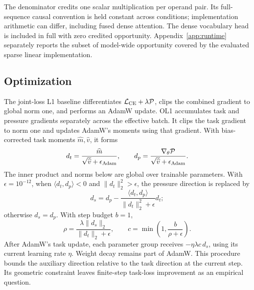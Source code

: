 The denominator credits one scalar multiplication per operand pair.
Its full-sequence causal convention is held constant across conditions;
implementation arithmetic can differ, including fused dense attention.
The dense vocabulary head is included in full with zero credited opportunity.
Appendix~\ref{app:runtime} separately reports the subset of model-wide
opportunity covered by the evaluated sparse linear implementation.

\subsection{Optimization}
\label{app:optimization}
The joint-loss L1 baseline differentiates
$\mathcal{L}_{\rm CE}+\lambda\mathcal{P}$, clips the combined gradient to
global norm one, and performs an AdamW update. OL1 accumulates task and
pressure gradients separately across the effective batch. It clips the task
gradient to norm one and updates AdamW's moments using that gradient.
With bias-corrected task moments $\widehat m,\widehat v$, it forms
\begin{equation}
 d_t=\frac{\widehat m}{\sqrt{\widehat v}+\epsilon_{\rm Adam}},
 \qquad
 d_p=\frac{\nabla_\theta\mathcal{P}}
 {\sqrt{\widehat v}+\epsilon_{\rm Adam}} .
\end{equation}
The inner product and norms below are global over trainable parameters.
With $\epsilon=10^{-12}$, when $\langle d_t,d_p\rangle<0$ and
$\|d_t\|_2^2>\epsilon$, the pressure direction is replaced by
\begin{equation}
 d_s=d_p-\frac{\langle d_t,d_p\rangle}
 {\|d_t\|_2^2+\epsilon}d_t;
\end{equation}
otherwise $d_s=d_p$. With step budget $b=1$,
\begin{equation}
 \rho=\frac{\lambda\|d_s\|_2}{\|d_t\|_2+\epsilon},
 \qquad c=\min\left(1,\frac{b}{\rho+\epsilon}\right).
\end{equation}
After AdamW's task update, each parameter group receives
$-\eta\lambda c\,d_s$, using its current learning rate $\eta$.
Weight decay remains part of AdamW. This procedure bounds the auxiliary
direction relative to the task direction at the current step. Its geometric
constraint leaves finite-step task-loss improvement as an empirical question.

